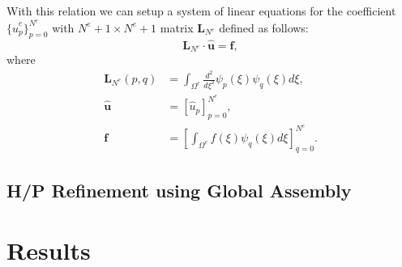 \documentclass[11pt,letterpaper]{article}
\begin{document}
With this relation we can setup a system of linear equations for
the coefficient $\{\hat u_p^e\}_{p=0}^{N^e}$ with $N^e+1 \times
N^e+1$ matrix $\mathbf{L}_{N^e}$ defined as follows:
\begin{equation}\label{loceqn}
    \mathbf{L}_{N^e} \cdot \mathbf{\hat u} = \mathbf{f},
\end{equation}
where
\begin{eqnarray}\label{locdefs}
\mathbf{L}_{N^e}(p,q) &=
\int_{\Omega^e}\frac{d^2}{d\xi^2}\psi_p(\xi)\psi_q(\xi) d\xi, \\
\mathbf{\hat u} &= \left[\hat u_p\right]_{p=0}^{N^e}, \\
\mathbf{f} &= \left[ \int_{\Omega^e} f(\xi) \psi_q(\xi) d\xi
\right]_{q=0}^{N^e}.
\end{eqnarray}

\subsection {H/P Refinement using Global Assembly}

\clearpage
\section {Results}





%



%
\end{document}

